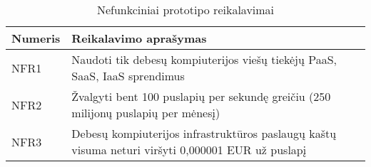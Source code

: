 \begin{table}[htbp]
  \centering
  \caption{Nefunkciniai prototipo reikalavimai}
    \begin{tabular}{|l|p{23.785em}|}
    \hline
    \textbf{Numeris} & \multicolumn{1}{l|}{\textbf{Reikalavimo aprašymas}} \bigstrut\\
    \hline
    NFR1   & Naudoti tik debesų kompiuterijos viešų tiekėjų PaaS, SaaS, IaaS sprendimus \bigstrut\\
    \hline
    NFR2   & Žvalgyti bent 100 puslapių per sekundę greičiu (250 milijonų puslapių per mėnesį) \\
    \hline
    NFR3   & Debesų kompiuterijos infrastruktūros paslaugų kaštų visuma neturi viršyti 0,000001 EUR už puslapį \bigstrut\\
    \hline
    \end{tabular}%
  \label{tab:non_functional_requirements}%
\end{table}%
